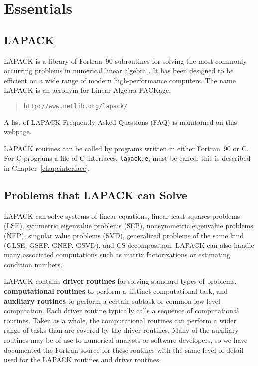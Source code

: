 \chapter{Essentials}\label{chapessentials}
\pagestyle{headings}

\section{LAPACK}

LAPACK is a library of Fortran~90 subroutines for solving the most commonly
occurring problems in numerical linear algebra
.
It has been designed to be efficient on a wide range of modern
high-performance computers. The name LAPACK is an acronym for Linear
Algebra PACKage. 
\begin{center}
\begin{quote}
{\tt http://www.netlib.org/lapack/}
\end{quote}
\end{center}
A list of LAPACK Frequently Asked Questions (FAQ)
is maintained on this webpage.

LAPACK routines can be called by programs written in either Fortran~90 or C.
For C programs a file of C interfaces, {\tt lapack.e}, must be called; this is described in 
Chapter~\ref{chapcinterface}.

\section{Problems that LAPACK can Solve}

LAPACK can solve systems of linear equations, linear least squares
problems (LSE), symmetric eigenvalue problems (SEP),
nonsymmetric eigenvalue problems (NEP), singular value problems (SVD),
generalized problems of the same kind (GLSE, GSEP, GNEP, GSVD), and CS decomposition.
LAPACK can also handle many
associated computations such as matrix factorizations
or estimating condition numbers.

LAPACK contains {\bf driver routines} for solving standard types of
problems,
{\bf computational routines} to perform a distinct
computational task, and {\bf auxiliary routines} to perform a certain
subtask or common low-level computation.  Each driver routine
typically calls a sequence of computational routines. Taken as a whole, the computational routines
can perform a wider range of tasks than are covered by the driver routines.
Many of the auxiliary routines may be of use to numerical analysts
or software developers, so we have documented the Fortran source for
these routines with the same level of detail used for the LAPACK
routines and driver routines.

